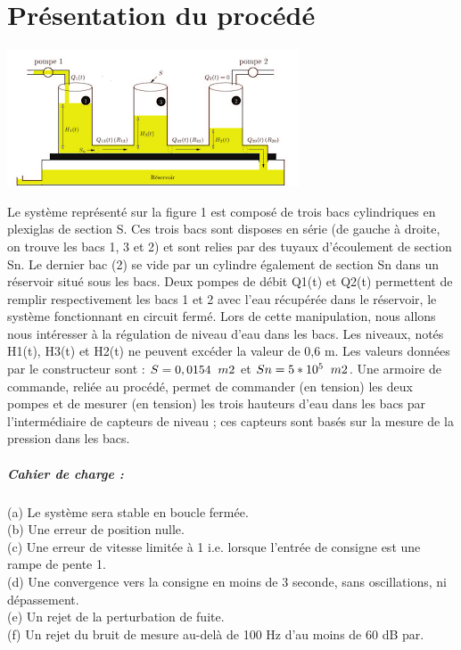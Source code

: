 \documentclass[12pt, a4paper, openany]{report}
\begin{document}
 \chapter*{Présentation du procédé}

\begin{center}
    \includegraphics[scale=1]{troisBacs.png}
    \label{fig1}
    \end{center}

Le système représenté sur la figure 1 est composé de trois bacs cylindriques en plexiglas de section S. Ces trois bacs sont disposes en série (de gauche à droite, on trouve les bacs 1, 3 et 2) et sont relies par des tuyaux d’écoulement de section Sn. Le dernier bac (2) se vide par un cylindre également de section Sn dans un réservoir situé sous les bacs.
Deux pompes de débit Q1(t) et Q2(t) permettent de remplir respectivement les bacs 1 et 2 avec l’eau récupérée dans le  réservoir, le système fonctionnant en circuit fermé.
Lors de cette manipulation, nous allons nous intéresser à la régulation de niveau d’eau dans les bacs. Les niveaux, notés H1(t), H3(t) et H2(t) ne peuvent excéder la valeur de 0,6 m.
Les valeurs données par le constructeur sont : $S = 0,0154 \hspace{2mm} m2$ et $Sn = 5*10^{5} \hspace{2mm} m2$.
Une armoire de commande, reliée au procédé, permet de commander (en tension) les deux pompes et de mesurer (en tension) les trois hauteurs d’eau dans les bacs par l'intermédiaire de capteurs de niveau ; ces capteurs sont basés sur la mesure de la pression dans les bacs.

\paragraph{Cahier de charge :} 

(a) Le système sera stable en boucle fermée.\\
(b) Une erreur de position nulle.\\
(c) Une erreur de vitesse limitée à 1 i.e. lorsque l'entrée de consigne est une rampe de pente 1.\\
(d) Une convergence vers la consigne en moins de 3 seconde, sans oscillations, ni dépassement.\\
(e) Un rejet de la perturbation de fuite.\\
(f) Un rejet du bruit de mesure au-delà de 100 Hz d’au moins de 60 dB par.\\  
\end{document}
